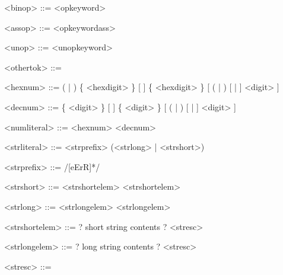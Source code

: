 \documentclass{article}
\newenvironment{bnf}
{
\begin{mdframed}
\begin{grammar}
}
{
\end{grammar}
\end{mdframed}
}
\begin{document}
\begin{bnf}
<binop> ::= \lit{=}
    \alt \lit{==}
    \alt \lit{\textgreater}
    \alt \lit{\textgreater=}
    \alt \lit{\textless}
    \alt \lit{\textless=}
    \alt \lit{!=}
    \alt \lit{\%}
    \alt \lit{~}
    \alt \lit{+}
    \alt \lit{++}
    \alt \lit{*}
    \alt \lit{**}
    \alt \lit{-}
    \alt \lit{/}
    \alt \lit{::}
    \alt <opkeyword>

<assop> ::= \lit{~=}
    \alt \lit{+=}
    \alt \lit{++=}
    \alt \lit{*=}
    \alt \lit{**=}
    \alt \lit{-=}
    \alt \lit{/=}
    \alt \lit{::=}
    \alt \lit{\%=}
    \alt <opkeywordass>

<unop> ::= \lit{-}
    \alt \lit{\#}
    \alt <unopkeyword>

<othertok> ::= \lit{(}
    \alt \lit{)}
    \alt \lit{->}
    \alt {}
    \alt {}
    \alt {}
    \alt \lit{;}
    \alt \lit{;;}
    \alt \lit{\$}
    \alt \lit{\$(}


<hexnum> ::= ( | ) \{ <hexdigit> \} [  ]
    \{ <hexdigit> \} [ ( | ) [ \lit{+} | \lit{-} ] <digit> ]

<decnum> ::= \{ <digit> \} [  ] \{ <digit> \} [ ( | )
    [ \lit{+} | \lit{-} ] <digit> ]

<numliteral> ::= <hexnum>
    \alt <decnum>


<strliteral> ::= <strprefix> (<strlong> | <strshort>)

<strprefix> ::= /[eErR]*/

<strshort> ::= \lit{\textquotedbl} <strshortelem> \lit{\textquotedbl}
    \alt \lit{\textquotesingle} <strshortelem> \lit{\textquotesingle}

<strlong> ::= \lit{\textquotedbl\textquotedbl\textquotedbl} <strlongelem>
        \lit{\textquotedbl\textquotedbl\textquotedbl}
    \alt \lit{\textquotesingle\textquotesingle\textquotesingle} <strlongelem>
        \lit{\textquotesingle\textquotesingle\textquotesingle}

<strshortelem> ::= ? short string contents ?
    \alt <stresc>

<strlongelem> ::= ? long string contents ?
    \alt <stresc>

<stresc> ::= \lit{\\a}
    \alt \lit{\\b}
    \alt \lit{\\f}
    \alt \lit{\\n}
    \alt \lit{\\r}
    \alt \lit{\\t}
    \alt \lit{\\v}
    \alt \lit{\\z}
    \alt \lit{\\\textquotedbl}
    \alt \lit{\\\textquotesingle}
    \alt \lit{\\}


\end{bnf}
\end{document}
